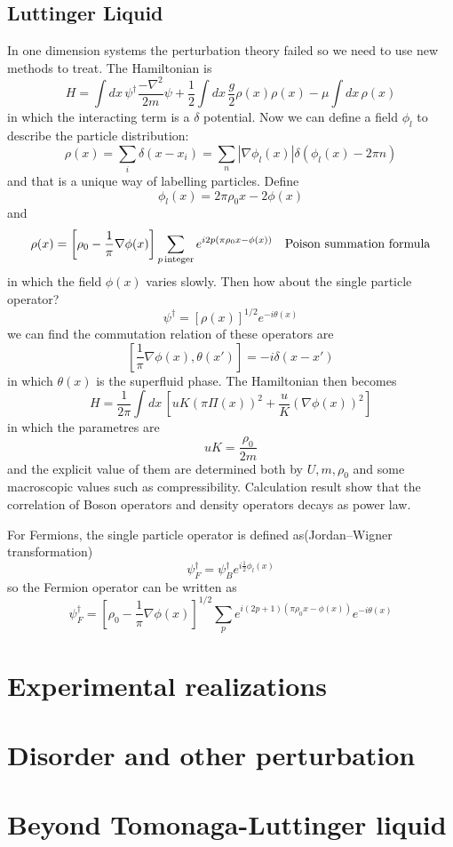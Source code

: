 \documentclass{article}
\begin{document}
\subsection{Luttinger Liquid}
In one dimension systems the perturbation theory failed so we need to use new methods to treat. The Hamiltonian is
$$
H = \int dx \, \psi^\dagger\frac{-\nabla^2}{2m}\psi + \frac{1}{2}\int dx\,\frac{g}{2} \rho(x)\rho(x) -\mu\int dx \, \rho(x)
$$
in which the interacting term is a $\delta$ potential. Now we can define a field $\phi_l$ to describe the particle distribution:
$$
\rho(x) = \sum_ i \delta(x-x_i) = \sum_n|\nabla\phi_l(x)|\delta(\phi_l(x)-2\pi n)
$$
and that is a unique way of labelling particles.
Define
$$
\phi_l(x) = 2\pi\rho_0 x -2\phi(x)
$$
and 
$$
\rho(x) = \left[\rho_0-\frac{1}{\pi}\nabla\phi(x)\right]\sum_{p\textrm{\,integer}} e^{i2p(\pi\rho_0x-\phi(x))}\quad \textrm{Poison summation formula}
$$
in which the field $\phi(x)$ varies slowly. Then how about the single particle operator?
$$
\psi^\dagger = [\rho(x)]^{1/2}e^{-i\theta(x)}
$$
we can find the commutation relation of these operators are
$$
\left[\frac{1}{\pi}\nabla\phi(x),\theta(x')\right] = -i\delta(x-x')
$$
in which $\theta(x)$ is the superfluid phase. The Hamiltonian then becomes
$$
H = \frac{1}{2\pi}\int dx\, \left[uK(\pi\Pi(x))^2+\frac{u}{K}(\nabla\phi(x))^2\right]
$$
in which the parametres are
$$
uK = \frac{\rho_0}{2m}
$$
and the explicit value of them are determined both by $U, m, \rho_0$ and some macroscopic values such as compressibility. Calculation result show that the correlation of Boson operators and density operators decays as power law.

For Fermions, the single particle operator is defined as(Jordan–Wigner transformation)
$$
\psi_F^\dagger = \psi_B^\dagger e^{i\frac{1}{2}\phi_l(x)}
$$
so the Fermion operator can be written as
$$
\psi^\dagger_F = \left[\rho_0-\frac{1}{\pi}\nabla\phi(x)\right]^{1/2}\sum_p e^{i(2p+1)(\pi\rho_0x-\phi(x))}e^{-i\theta(x)}
$$

\section{Experimental realizations}

\section{Disorder and other perturbation}

\section{Beyond Tomonaga-Luttinger liquid}
\end{document}
